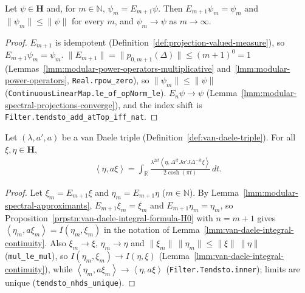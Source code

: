 \begin{lemma}
    \label{lmm:modular-spectral-approximants}
    \leanok
    Let $\psi \in \mathbf{H}$ and, for $m \in \mathbb{N}$, $\psi_m = E_{m+1}\psi$. Then $E_{m+1}\psi_m = \psi_m$ and $\|\psi_m\| \le \|\psi\|$ for every $m$, and $\psi_m \to \psi$ as $m \to \infty$.
\end{lemma}
\begin{proof}
    \leanok
    $E_{m+1}$ is idempotent (Definition~\ref{def:projection-valued-measure}), so $E_{m+1}\psi_m = \psi_m$. $\|E_{m+1}\| = \|p_{0,m+1}(\Delta)\| \le (m+1)^0 = 1$ (Lemmas~\ref{lmm:modular-power-operators-multiplicative} and~\ref{lmm:modular-power-operators}, \texttt{Real.rpow\_zero}), so $\|\psi_m\| \le \|\psi\|$ (\texttt{ContinuousLinearMap.le\_of\_opNorm\_le}). $E_n\psi \to \psi$ (Lemma~\ref{lmm:modular-spectral-projections-converge}), and the index shift is \texttt{Filter.tendsto\_add\_atTop\_iff\_nat}.
\end{proof}

\begin{proposition}
    \label{prpstn:van-daele-integral-formula}
    \leanok
    Let $(\lambda, a', a)$ be a van Daele triple (Definition~\ref{def:van-daele-triple}). For all $\xi, \eta \in \mathbf{H}$,
    \begin{align}
        \left< \eta, a\xi \right> = \int_{\mathbb{R}} \frac{\lambda^{2it}\left< \eta, \Delta^{it}Ja'J\Delta^{-it}\xi \right>}{2\cosh(\pi t)} \, dt.
    \end{align}
\end{proposition}
\begin{proof}
    \leanok
    Let $\xi_m = E_{m+1}\xi$ and $\eta_m = E_{m+1}\eta$ ($m \in \mathbb{N}$). By Lemma~\ref{lmm:modular-spectral-approximants}, $E_{m+1}\xi_m = \xi_m$ and $E_{m+1}\eta_m = \eta_m$, so Proposition~\ref{prpstn:van-daele-integral-formula-H0} with $n = m + 1$ gives $\left< \eta_m, a\xi_m \right> = I(\eta_m, \xi_m)$ in the notation of Lemma~\ref{lmm:van-daele-integral-continuity}. Also $\xi_m \to \xi$, $\eta_m \to \eta$ and $\|\xi_m\|\,\|\eta_m\| \le \|\xi\|\,\|\eta\|$ (\texttt{mul\_le\_mul}), so $I(\eta_m, \xi_m) \to I(\eta, \xi)$ (Lemma~\ref{lmm:van-daele-integral-continuity}), while $\left< \eta_m, a\xi_m \right> \to \left< \eta, a\xi \right>$ (\texttt{Filter.Tendsto.inner}); limits are unique (\texttt{tendsto\_nhds\_unique}).
\end{proof}

